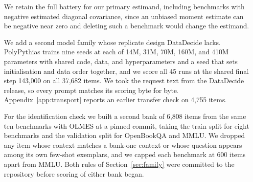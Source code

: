 We retain the full battery for our primary estimand, including benchmarks with negative estimated diagonal covariance, since an unbiased moment estimate can be negative near zero and deleting such a benchmark would change the estimand.

We add a second model family whose replicate design DataDecide lacks. PolyPythias \citep{vanderwal2025} trains nine seeds at each of 14M, 31M, 70M, 160M, and 410M parameters with shared code, data, and hyperparameters and a seed that sets initialisation and data order together, and we score all 45 runs at the shared final step 143,000 on all 37,682 items. We took the request text from the DataDecide release, so every prompt matches its scoring byte for byte. Appendix~\ref{app:transport} reports an earlier transfer check on 4,755 items.

For the identification check we built a second bank of 6,808 items from the same ten benchmarks with OLMES at a pinned commit, taking the train split for eight benchmarks and the validation split for OpenBookQA and MMLU. We dropped any item whose context matches a bank-one context or whose question appears among its own few-shot exemplars, and we capped each benchmark at 600 items apart from MMLU. Both rules of Section~\ref{sec:family} were committed to the repository before scoring of either bank began.


